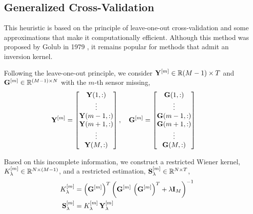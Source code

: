 


\subsection{Generalized Cross-Validation}

This heuristic is based on the principle of leave-one-out cross-validation and some approximations that make it computationally efficient. 
%
Although this method was proposed by Golub in 1979 \cite{GCV_Golub}, it remains popular for methods that admit an inversion kernel.

Following the leave-one-out principle, we consider $\mathbf{Y}^{[m]}\in\mathbb{R}{(M-1)\times T}$ and $\mathbf{G}^{[m]} \in \mathbb{R}^{(M-1)\times N}$ with the $m$-th sensor missing,
\begin{align}
\mathbf{Y}^{[m]} &=
\begin{bmatrix}
\mathbf{Y}(1,:) \\
\vdots \\
\mathbf{Y}(m-1,:) \\
\mathbf{Y}(m+1,:) \\
\vdots \\
\mathbf{Y}(M,:) 
\end{bmatrix},
\quad
\mathbf{G}^{[m]} =
\begin{bmatrix}
\mathbf{G}(1,:) \\
\vdots \\
\mathbf{G}(m-1,:) \\
\mathbf{G}(m+1,:) \\
\vdots \\
\mathbf{G}(M,:) 
\end{bmatrix}
\end{align}

Based on this incomplete information, we construct a restricted Wiener kernel, $K_\lambda^{[m]} \in \mathbb{R}^{N\times(M-1)}$, and a restricted estimation, $\mathbf{S}_\lambda^{[m]} \in \mathbb{R}^{N\times T}$,
\begin{align}
K_\lambda^{[m]}
&=
\left( \mathbf{G}^{[m]} \right)^T\left(  \mathbf{G}^{[m]}\, \left( \mathbf{G}^{[m]} \right)^T + \lambda\mathbf{I}_M  \right)^{-1}
\\
\mathbf{S}_\lambda^{[m]}
&=
K_\lambda^{[m]}\, \mathbf{Y}_\lambda^{[m]}
\end{align}

